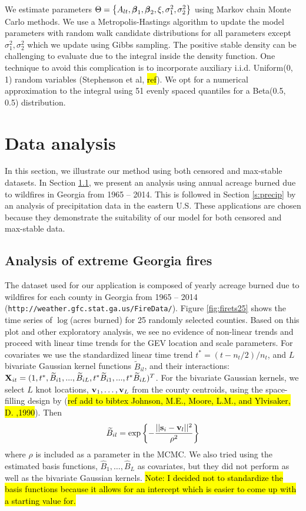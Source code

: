 \documentclass[11pt]{article}
\begin{document}
We estimate parameters $\Theta = \left\{A_{lt}, \mbox{\boldmath $\beta$}_1, \mbox{\boldmath $\beta$}_2, \xi, \sigma^2_1, \sigma^2_2 \right\}$ using Markov chain Monte Carlo methods.
We use a Metropolis-Hastings algorithm to update the model parameters with random walk candidate distributions for all parameters except $\sigma^2_1, \sigma^2_2$ which we update using Gibbs sampling.
The positive stable density can be challenging to evaluate due to the integral inside the density function.
One technique to avoid this complication is to incorporate auxiliary i.i.d. Uniform(0, 1) random variables (Stephenson et al, \hl{ref}).
We opt for a numerical approximation to the integral using 51 evenly spaced quantiles for a Beta(0.5, 0.5) distribution.

\section{Data analysis}\label{s:analysis}
In this section, we illustrate our method using both censored and max-stable datasets.
In Section \ref{s:georgia}, we present an analysis using annual acreage burned due to wildfires in Georgia from 1965 -- 2014.
This is followed in Section \ref{s:precip} by an analysis of precipitation data in the eastern U.S.
These applications are chosen because they demonstrate the suitability of our model for both censored and max-stable data.

\subsection{Analysis of extreme Georgia fires}\label{s:georgia}
The dataset used for our application is composed of yearly acreage burned due to wildfires for each county in Georgia from 1965 -- 2014 (\texttt{http://weather.gfc.stat.ga.us/FireData/}).
Figure \ref{fig:firets25} shows the time series of $\log$(acres burned) for 25 randomly selected counties.
Based on this plot and other exploratory analysis, we see no evidence of non-linear trends and proceed with linear time trends for the GEV location and scale parameters.
For covariates we use the standardized linear time trend $t^* = (t-n_t/2)/n_t$, and $L$ bivariate Gaussian kernel functions $\widetilde{B}_{il}$, and their interactions: $\mbox{\bf X}_{it} = (1,t^*,\widetilde{B}_{i1},...,\widetilde{B}_{iL},t^*\widetilde{B}_{i1},...,t^*\widetilde{B}_{iL})^T$.
For the bivariate Gaussian kernels, we select $L$ knot locations, $\mbox{\bf v}_{1}, \ldots, \mbox{\bf v}_{L}$ from the county centroids, using the space-filling design by (\hl{ref add to bibtex Johnson, M.E., Moore, L.M., and Ylvisaker, D. ,1990}).
Then
\begin{align}
  \widetilde{B}_{il} = \exp\left\{-\frac{||\mbox{\bf s}_i - \mbox{\bf v}_l||^2}{\rho^2}\right\}
\end{align}
where $\rho$ is included as a parameter in the MCMC.
We also tried using the estimated basis functions, $\hat{B}_1, \ldots, \hat{B}_L$ as covariates, but they did not perform as well as the bivariate Gaussian kernels.
\hl{Note: I decided not to standardize the basis functions because it allows for an intercept which is easier to come up with a starting value for.}
\end{document}
